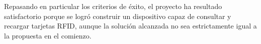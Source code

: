 \documentclass[%
        final,
        notitlepage,
        narroweqnarray,
        inline,
        ]{ieee}
\begin{document}
\bigskip
Repasando en particular los criterios de éxito, el proyecto ha resultado satisfactorio
porque se logró construir un dispositivo capaz de consultar y recargar tarjetas RFID,
aunque la solución alcanzada no sea estrictamente igual a la propuesta en el comienzo.


\bigskip





\end{document}
